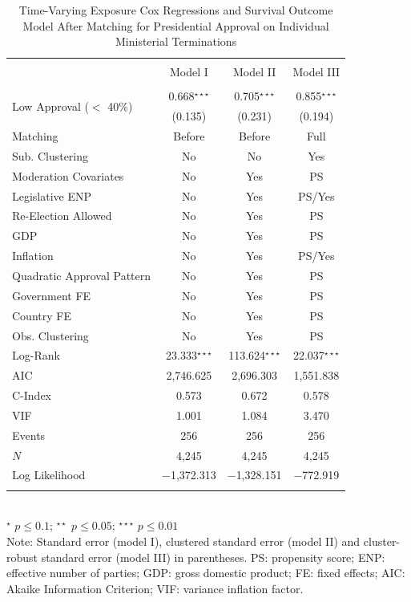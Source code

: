 \documentclass[12pt,halfline,a4paper]{ouparticle}
\begin{document}
\begin{table}[h] \centering 
  \caption{Time-Varying Exposure Cox Regressions and Survival Outcome Model After Matching for Presidential Approval on Individual Ministerial Terminations} 
  \label{TAB1} 
\begin{tabular}{@{\extracolsep{5pt}}lccc} 
\\[-1.8ex] \hline \\[-1.8ex] 
 & Model I & Model II & Model III \\ 
\midrule\\[-1.8ex] 
 \multirow{2}{*}{Low Approval ($<$ 40\%)} & 0.668$^{\star\star\star}$ & 0.705$^{\star\star\star}$ & 0.855$^{\star\star\star}$ \\ 
  & (0.135) & (0.231) & (0.194) \\ \midrule
 Matching & Before & Before & Full \\ 
Sub. Clustering & No & No & Yes \\ \midrule
Moderation Covariates & No & Yes & PS \\ 
Legislative ENP & No & Yes & PS/Yes \\ 
Re-Election Allowed & No & Yes & PS \\ 
GDP & No & Yes & PS \\ 
Inflation & No & Yes & PS/Yes \\ 
Quadratic Approval Pattern & No & Yes & PS \\ 
Government FE & No & Yes & PS \\ 
Country FE & No & Yes & PS \\ 
Obs. Clustering & No & Yes & PS \\ \midrule
Log-Rank & 23.333$^{\star\star\star}$ & 113.624$^{\star\star\star}$ & 22.037$^{\star\star\star}$ \\ 
AIC & 2,746.625 & 2,696.303 & 1,551.838 \\ 
C-Index & 0.573 & 0.672 & 0.578 \\ 
VIF & 1.001 & 1.084 & 3.470 \\ \midrule
Events & 256 & 256 & 256 \\ 
$N$ & 4,245 & 4,245 & 4,245 \\ 
Log Likelihood & $-$1,372.313 & $-$1,328.151 & $-$772.919 \\ 
\bottomrule \\[-1.8ex] 
\end{tabular} \\
{\footnotesize $^{\star}$ $p \leq 0.1$; $^{\star\star}$ $p \leq 0.05$; $^{\star\star\star}$ $p \leq 0.01$ \\
Note: Standard error (model I), clustered standard error (model II) and cluster-robust standard error (model III) in parentheses. PS: propensity score; ENP: effective number of parties; GDP: gross domestic product; FE: fixed effects; AIC: Akaike Information Criterion; VIF: variance inflation factor.} 
\end{table} 
\end{document}
